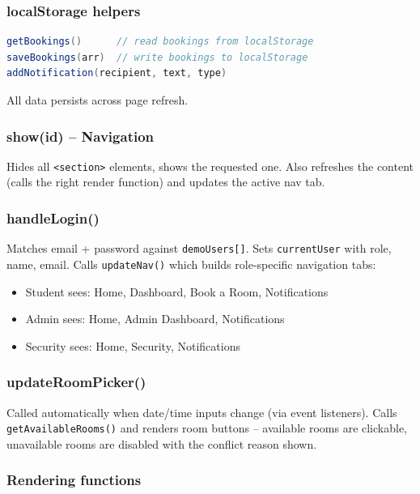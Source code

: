 \documentclass[12pt,a4paper]{article}
\begin{document}
\subsubsection{localStorage helpers}
\begin{lstlisting}[language=Java]
getBookings()      // read bookings from localStorage
saveBookings(arr)  // write bookings to localStorage
addNotification(recipient, text, type)
\end{lstlisting}

All data persists across page refresh.

\subsubsection{show(id) -- Navigation}

Hides all \texttt{<section>} elements, shows the requested one. Also refreshes the content (calls the right render function) and updates the active nav tab.

\subsubsection{handleLogin()}

Matches email + password against \texttt{demoUsers[]}. Sets \texttt{currentUser} with role, name, email. Calls \texttt{updateNav()} which builds role-specific navigation tabs:
\begin{itemize}
  \item Student sees: Home, Dashboard, Book a Room, Notifications
  \item Admin sees: Home, Admin Dashboard, Notifications
  \item Security sees: Home, Security, Notifications
\end{itemize}

\subsubsection{updateRoomPicker()}

Called automatically when date/time inputs change (via event listeners). Calls \texttt{getAvailableRooms()} and renders room buttons -- available rooms are clickable, unavailable rooms are disabled with the conflict reason shown.

\subsubsection{Rendering functions}
\end{document}
